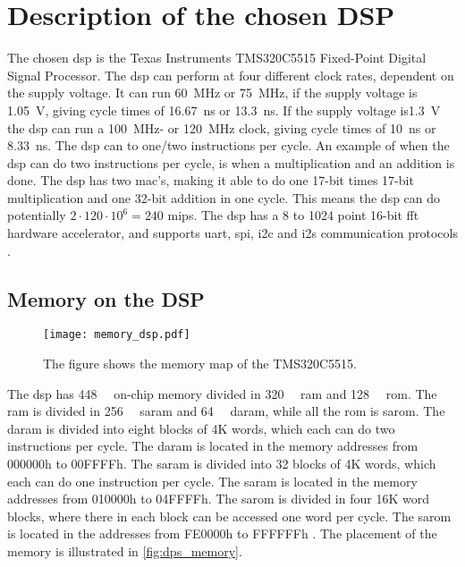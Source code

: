 \section{Description of the chosen DSP}


The chosen \gls{dsp} is the Texas Instruments TMS320C5515 Fixed-Point Digital Signal Processor.
The \gls{dsp} can perform at four different clock rates, dependent on the supply voltage. It can run \SI{60}{\mega\hertz} or \SI{75}{\mega\hertz}, if the supply voltage is \SI{1.05}{\volt}, giving cycle times of \SI{16.67}{\nano\second} or \SI{13.3}{\nano\second}. If the supply voltage is\SI{1.3}{\volt} the \gls{dsp} can run a \SI{100}{\mega\hertz}- or \SI{120}{\mega\hertz} clock, giving cycle times of \SI{10}{\nano\second} or \SI{8.33}{\nano\second}. The \gls{dsp} can to one/two instructions per cycle. An example of when the \gls{dsp} can do two instructions per cycle, is when a multiplication and an addition is done. The \gls{dsp} has two \gls{mac}'s, making it able to do one 17-bit times 17-bit multiplication and one 32-bit addition in one cycle. This means the \gls{dsp} can do potentially $2 \cdot 120 \cdot 10^6 = 240$ \gls{mips}. The \gls{dsp} has a 8 to 1024 point 16-bit \gls{fft} hardware accelerator, and supports \gls{uart}, \gls{spi}, \gls{i2c} and \gls{i2s} communication protocols \cite{c55515}.
\subsection{Memory on the DSP}
\begin{figure}[h]
	\centering
		\texttt{[image: memory\_dsp.pdf]}
		\caption{The figure shows the memory map of the TMS320C5515.}
		\label{fig:dps_memory}
\end{figure}
The \gls{dsp} has \SI{448}{\kilo\byte} on-chip memory divided in \SI{320}{\kilo\byte} \gls{ram} and \SI{128}{\kilo\byte} \gls{rom}. The \gls{ram} is divided in \SI{256}{\kilo\byte} \gls{saram} and \SI{64}{\kilo\byte} \gls{daram}, while all the \gls{rom} is \gls{sarom}.
The \gls{daram} is divided into eight blocks of 4K words, which each can do two instructions per cycle. The \gls{daram} is located in the memory addresses from 000000h to 00FFFFh. The \gls{saram} is divided into 32 blocks of 4K words, which each can do one instruction per cycle. The \gls{saram} is located in the memory addresses from 010000h to 04FFFFh. The \gls{sarom} is divided in four 16K word blocks, where there in each block can be accessed one word per cycle. The \gls{sarom} is located in the addresses from FE0000h to FFFFFFh \cite{c5515}. The placement of the memory is illustrated in \autoref{fig:dps_memory}.
